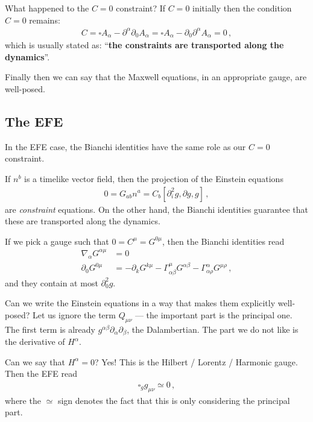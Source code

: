 \documentclass[main.tex]{subfiles}
\begin{document}
What happened to the \(C =0 \) constraint? 
If \(C =0\) initially then the condition \(C = 0\) remains: 
%
\begin{align}
C = \square A_\alpha - \partial^{\alpha } \partial_{0} A_\alpha = \square A_\alpha - \partial_0 \partial^{\alpha } A_\alpha = 0
\,,
\end{align}
%
which is usually stated as:
``\textbf{the constraints are transported along the dynamics}''.

Finally then we can say that the Maxwell equations, in an appropriate gauge, are well-posed.

\subsection{The EFE}

In the EFE case, the Bianchi identities have the same role as our \(C = 0\) constraint. 

If \(n^b  \) is a timelike vector field, then the projection of the Einstein equations 
%
\begin{align}
0 = G_{ab} n^a = C_b [\partial_{i}^2 g, \partial g, g]
\,,
\end{align}
%
are \emph{constraint} equations.
On the other hand, the Bianchi identities guarantee that these are transported along the dynamics. 

If we pick a gauge such that \(0 = C^{\mu } = G^{0 \mu }\), then the Bianchi identities read 
%
\begin{align}
\nabla_{\alpha } G^{\alpha \mu } &= 0  \\
\partial_0 G^{0 \mu } &= - \partial_{k} G^{k \mu } - \Gamma^{\mu }_{\alpha \beta } G^{\alpha \beta } - \Gamma^{\alpha }_{\alpha \rho  } G^{\mu \rho }
\,,
\end{align}
%
and they contain at most \(\partial_0^2 g\). 

Can we write the Einstein equations in a way that makes them explicitly well-posed? 
Let us ignore the term \(Q_{\mu \nu }\) --- the important part is the principal one. 
The first term is already \(g^{\alpha \beta } \partial_{\alpha } \partial_{\beta }\), the Dalambertian. 
The part we do not like is the derivative of \(H^{\alpha }\). 

Can we say that \(H^{\alpha } = 0\)? Yes! This is the Hilbert / Lorentz / Harmonic gauge. 
Then the EFE read 
%
\begin{align}
\square_g g_{\mu \nu } \simeq 0
\,,
\end{align}
%
where the \(\simeq\) sign denotes the fact that this is only considering the principal part. 
\end{document}
